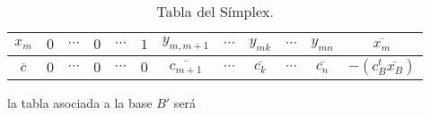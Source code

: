 \begin{table}[H]
\begin{tabular}{c|cccccccccc|c}
		$x_m$                               & $0$                     & $\cdots$                     & $0$                     & $\cdots$                     & $1$                     & $y_{m,m+1}$                              & $\cdots$                     & $y_{mk}$                             & $\cdots$                    & $y_{mn}$                              & $\overline{x_m}$                               \\ \hline
		\multicolumn{1}{c|}{$\overline{c}$} & \multicolumn{1}{c}{$0$} & \multicolumn{1}{c}{$\cdots$} & \multicolumn{1}{c}{$0$} & \multicolumn{1}{c}{$\cdots$} & \multicolumn{1}{c}{$0$} & \multicolumn{1}{c}{$\overline{c_{m+1}}$} & \multicolumn{1}{c}{$\cdots$} & \multicolumn{1}{c}{$\overline{c_k}$} & \multicolumn{1}{c}{$\cdots$} & \multicolumn{1}{c|}{$\overline{c_n}$} & \multicolumn{1}{c}{$-(c_{B}^t\overline{x_B})$}
	\end{tabular}
	\caption{Tabla del Símplex.}
\end{table}
la tabla asociada a la base $B'$ será
